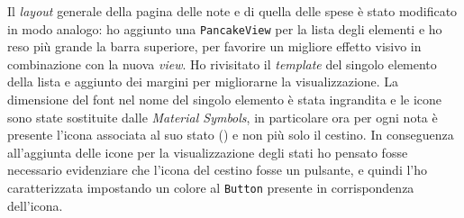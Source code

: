 Il \textit{layout} generale della pagina delle note e di quella delle spese è stato modificato in modo analogo: ho aggiunto una \texttt{PancakeView} per la lista degli elementi e ho reso più grande la barra superiore, per favorire un migliore effetto visivo in combinazione con la nuova \textit{view}. Ho rivisitato il \textit{template} del singolo elemento della lista e aggiunto dei margini per migliorarne la visualizzazione. La dimensione del font nel nome del singolo elemento è stata ingrandita e le icone sono state sostituite dalle \textit{Material Symbols}, in particolare ora per ogni nota è presente l'icona associata al suo stato () e non più solo il cestino. In conseguenza all'aggiunta delle icone per la visualizzazione degli stati ho pensato fosse necessario evidenziare che l'icona del cestino fosse un pulsante, e quindi l'ho caratterizzata impostando un colore al \texttt{Button} presente in corrispondenza dell'icona.


